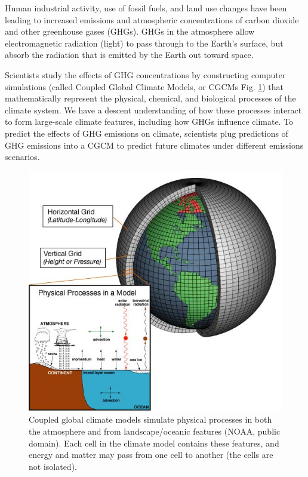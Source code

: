 \documentclass[]{book}
\begin{document}
Human industrial activity, use of fossil fuels, and land use changes have been leading to increased emissions and atmospheric concentrations of carbon dioxide and other greenhouse gases (GHGs). GHGs in the atmosphere allow electromagnetic radiation (light) to pass through to the Earth's surface, but absorb the radiation that is emitted by the Earth out toward space.

Scientists study the effects of GHG concentrations by constructing computer simulations (called Coupled Global Climate Models, or CGCMs Fig. \ref{fig:model-fig}) that mathematically represent the physical, chemical, and biological processes of the climate system. We have a descent understanding of how these processes interact to form large-scale climate features, including how GHGs influence climate. To predict the effects of GHG emissions on climate, scientists plug predictions of GHG emissions into a CGCM to predict future climates under different emissions scenarios.

\begin{figure}
\centering
\includegraphics{chapter_materials/climate_ecology/model_picture.jpg}
\caption{\label{fig:model-fig}Coupled global climate models simulate physical processes in both the atmosphere and from landscape/oceanic features (NOAA, public domain). Each cell in the climate model contains these features, and energy and matter may pass from one cell to another (the cells are not isolated).}
\end{figure}
\end{document}
